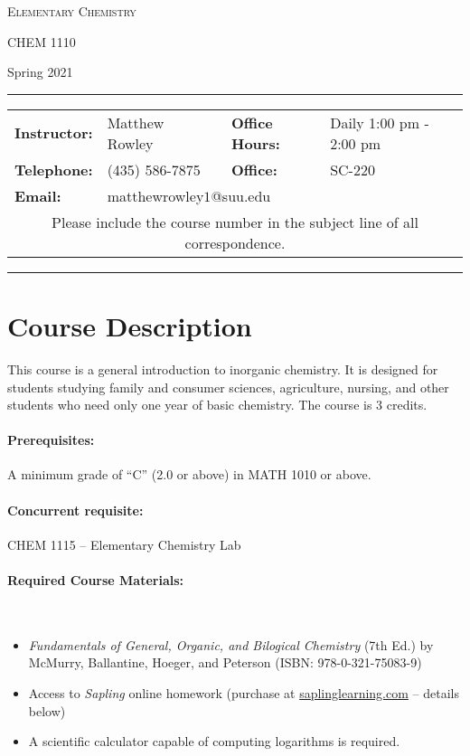 \documentclass[12pt, letterpaper]{article}
\begin{document}
\begin{center}
{\Large \textsc{Elementary Chemistry}}

CHEM 1110
\end{center}
\begin{center}
	{\large Spring 2021}
\end{center}
\begin{center}
	\rule{0.85\textwidth}{0.4pt}
	\begin{tabular}{llcll}
		\textbf{Instructor:} & Matthew Rowley & & \textbf{Office Hours:} & Daily 1:00 pm - 2:00 pm \\
		\textbf{Telephone:} & (435) 586-7875 & & \textbf{Office:} & SC-220 \\
		\textbf{Email:} & \multicolumn{3}{l}{matthewrowley$1$@suu.edu}\\
		\multicolumn{5}{c}{Please include the course number in the subject line of all correspondence.} 
	\end{tabular}
	\rule{0.85\textwidth}{0.4pt}
\end{center}

\section*{Course Description} 
This course is a general introduction to inorganic chemistry. It is designed for students studying family and consumer sciences, agriculture, nursing, and other students who need only one year of basic chemistry. The course is 3 credits.

\paragraph{Prerequisites:}
A minimum grade of ``C'' (2.0 or above) in MATH 1010 or above.

\paragraph{Concurrent requisite:}
CHEM 1115 -- Elementary Chemistry Lab

\paragraph{Required Course Materials:} ~

\begin{itemize}
\item \emph{Fundamentals of General, Organic, and Bilogical Chemistry} (7th Ed.) by McMurry, Ballantine, Hoeger, and Peterson (ISBN: 978-0-321-75083-9)
\item Access to \emph{Sapling} online homework (purchase at \href{http://saplinglearning.com}{saplinglearning.com} -- details below) 
\item A scientific calculator capable of computing logarithms is required.
\end{itemize}
\end{document}
